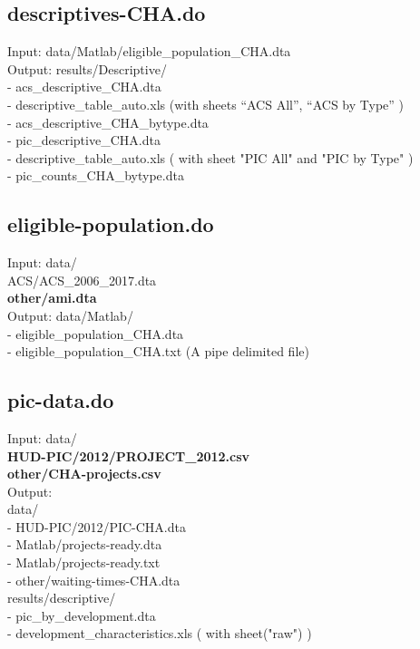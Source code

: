 \documentclass[11pt]{article}
\begin{document}
\subsection{descriptives-CHA.do}
Input: data/Matlab/eligible\_population\_CHA.dta \\
Output:  results/Descriptive/ \\
- acs\_descriptive\_CHA.dta \\
- descriptive\_table\_auto.xls  (with sheets “ACS All”, “ACS by Type” )\\
		- acs\_descriptive\_CHA\_bytype.dta\\
		- pic\_descriptive\_CHA.dta\\
		- descriptive\_table\_auto.xls ( with sheet "PIC All" and "PIC by Type" )\\
		- pic\_counts\_CHA\_bytype.dta\\

\subsection{eligible-population.do}
Input: data/\\
ACS/ACS\_2006\_2017.dta\\
\textbf{other/ami.dta}\\
Output: data/Matlab/ \\
- eligible\_population\_CHA.dta\\
- eligible\_population\_CHA.txt (A pipe delimited file)

\subsection{pic-data.do}
Input: data/ \\
\textbf{HUD-PIC/2012/PROJECT\_2012.csv} \\
\textbf{other/CHA-projects.csv} \\
Output: \\
data/ \\
- HUD-PIC/2012/PIC-CHA.dta \\
- Matlab/projects-ready.dta \\
- Matlab/projects-ready.txt \\
- other/waiting-times-CHA.dta\\
results/descriptive/ \\
-   pic\_by\_development.dta \\
- development\_characteristics.xls ( with sheet("raw") ) \\
\end{document}
